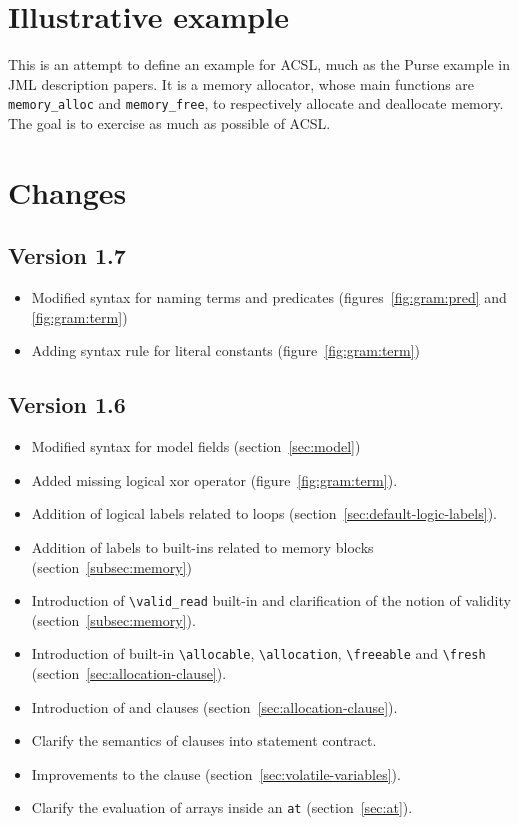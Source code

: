 \documentclass[a4paper,web]{frama-c-book}
\begin{document}






\section{Illustrative example}
\label{sec:illustrative-example}
This is an attempt to define an example for ACSL, much as the Purse
example in JML description papers.  It is a memory allocator, whose
main functions are \lstinline|memory_alloc| and \lstinline|memory_free|, to
respectively allocate and deallocate memory.  The goal is to exercise
as much as possible of ACSL.

%

\section{Changes}

\subsection{Version 1.7}
\begin{itemize}
\item Modified syntax for naming terms and predicates (figures~\ref{fig:gram:pred} and \ref{fig:gram:term})
\item Adding syntax rule for literal constants (figure~\ref{fig:gram:term})
\end{itemize}

\subsection{Version 1.6}
\begin{itemize}
\item Modified syntax for model fields (section~\ref{sec:model})
\item Added missing logical xor operator (figure~\ref{fig:gram:term}).
\item Addition of logical labels related to loops
  (section~\ref{sec:default-logic-labels}).
\item Addition of labels to built-ins related to memory blocks
  (section~\ref{subsec:memory})
\item Introduction of \lstinline|\valid_read| built-in and clarification of
the notion of validity (section~\ref{subsec:memory}).
\item Introduction of built-in \lstinline|\allocable|,
  \lstinline|\allocation|, \lstinline|\freeable| and
  \lstinline|\fresh| (section~\ref{sec:allocation-clause}).
\item Introduction of \allocates and \frees clauses
  (section~\ref{sec:allocation-clause}).
\item Clarify the semantics of \assigns clauses into statement contract.
\item Improvements to the \volatile clause 
(section~\ref{sec:volatile-variables}).
\item Clarify the evaluation of arrays inside an \lstinline|at| 
  (section~\ref{sec:at}).
\end{itemize}
\end{document}
